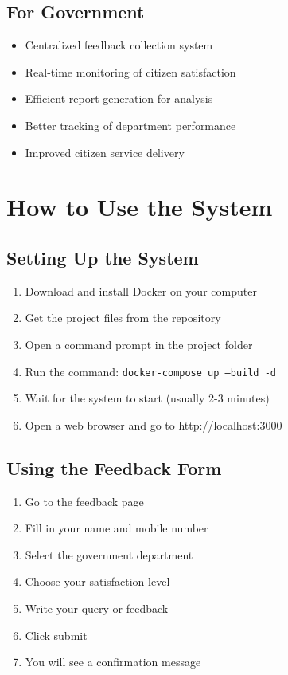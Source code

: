 \documentclass[12pt,a4paper]{article}
\begin{document}
\subsection{For Government}
\begin{itemize}
    \item Centralized feedback collection system
    \item Real-time monitoring of citizen satisfaction
    \item Efficient report generation for analysis
    \item Better tracking of department performance
    \item Improved citizen service delivery
\end{itemize}

\section{How to Use the System}

\subsection{Setting Up the System}
\begin{enumerate}
    \item Download and install Docker on your computer
    \item Get the project files from the repository
    \item Open a command prompt in the project folder
    \item Run the command: \texttt{docker-compose up --build -d}
    \item Wait for the system to start (usually 2-3 minutes)
    \item Open a web browser and go to http://localhost:3000
\end{enumerate}

\subsection{Using the Feedback Form}
\begin{enumerate}
    \item Go to the feedback page
    \item Fill in your name and mobile number
    \item Select the government department
    \item Choose your satisfaction level
    \item Write your query or feedback
    \item Click submit
    \item You will see a confirmation message
\end{enumerate}
\end{document}
